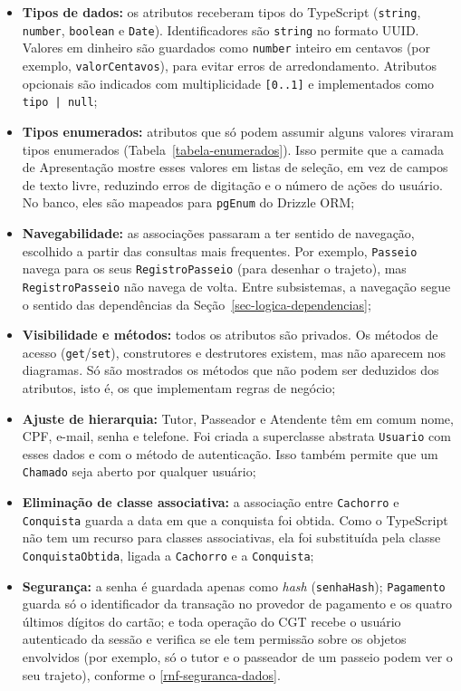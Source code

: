 \begin{itemize}
	\item \textbf{Tipos de dados:} os atributos receberam tipos do TypeScript (\texttt{string}, \texttt{number}, \texttt{boolean} e \texttt{Date}). Identificadores são \texttt{string} no formato UUID. Valores em dinheiro são guardados como \texttt{number} inteiro em centavos (por exemplo, \texttt{valorCentavos}), para evitar erros de arredondamento. Atributos opcionais são indicados com multiplicidade \texttt{[0..1]} e implementados como \texttt{tipo | null};

	\item \textbf{Tipos enumerados:} atributos que só podem assumir alguns valores viraram tipos enumerados (Tabela~\ref{tabela-enumerados}). Isso permite que a camada de Apresentação mostre esses valores em listas de seleção, em vez de campos de texto livre, reduzindo erros de digitação e o número de ações do usuário. No banco, eles são mapeados para \texttt{pgEnum} do Drizzle ORM;

	\item \textbf{Navegabilidade:} as associações passaram a ter sentido de navegação, escolhido a partir das consultas mais frequentes. Por exemplo, \texttt{Passeio} navega para os seus \texttt{RegistroPasseio} (para desenhar o trajeto), mas \texttt{RegistroPasseio} não navega de volta. Entre subsistemas, a navegação segue o sentido das dependências da Seção~\ref{sec-logica-dependencias};

	\item \textbf{Visibilidade e métodos:} todos os atributos são privados. Os métodos de acesso (\texttt{get}/\texttt{set}), construtores e destrutores existem, mas não aparecem nos diagramas. Só são mostrados os métodos que não podem ser deduzidos dos atributos, isto é, os que implementam regras de negócio;

	\item \textbf{Ajuste de hierarquia:} Tutor, Passeador e Atendente têm em comum nome, CPF, e-mail, senha e telefone. Foi criada a superclasse abstrata \texttt{Usuario} com esses dados e com o método de autenticação. Isso também permite que um \texttt{Chamado} seja aberto por qualquer usuário;

	\item \textbf{Eliminação de classe associativa:} a associação entre \texttt{Cachorro} e \texttt{Conquista} guarda a data em que a conquista foi obtida. Como o TypeScript não tem um recurso para classes associativas, ela foi substituída pela classe \texttt{ConquistaObtida}, ligada a \texttt{Cachorro} e a \texttt{Conquista};

	\item \textbf{Segurança:} a senha é guardada apenas como \textit{hash} (\texttt{senhaHash}); \texttt{Pagamento} guarda só o identificador da transação no provedor de pagamento e os quatro últimos dígitos do cartão; e toda operação do CGT recebe o usuário autenticado da sessão e verifica se ele tem permissão sobre os objetos envolvidos (por exemplo, só o tutor e o passeador de um passeio podem ver o seu trajeto), conforme o \ref{rnf-seguranca-dados}.
\end{itemize}

